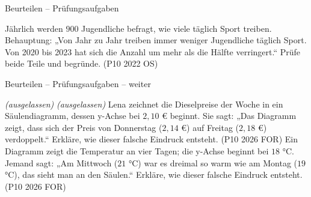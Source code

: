 \begin{aufgabe}{Beurteilen – Prüfungsaufgaben}
\begin{teile}
\teil Jährlich werden $900$ Jugendliche befragt, wie viele täglich Sport treiben. Behauptung: „Von Jahr zu Jahr treiben immer weniger Jugendliche täglich Sport. Von 2020 bis 2023 hat sich die Anzahl um mehr als die Hälfte verringert.“ Prüfe beide Teile und begründe. \hfill (P10 2022 OS)

\end{teile}
\end{aufgabe}

\begin{aufgabe}{Beurteilen – Prüfungsaufgaben – weiter}
\begin{teile}
% 
\steil \textit{(ausgelassen)}
% 
\steil \textit{(ausgelassen)}
\teil Lena zeichnet die Dieselpreise der Woche in ein Säulendiagramm, dessen y-Achse bei $2{,}10$ € beginnt. Sie sagt: „Das Diagramm zeigt, dass sich der Preis von Donnerstag ($2{,}14$ €) auf Freitag ($2{,}18$ €) verdoppelt.“ Erkläre, wie dieser falsche Eindruck entsteht. \hfill (P10 2026 FOR)
\teil Ein Diagramm zeigt die Temperatur an vier Tagen; die y-Achse beginnt bei $18$ °C. Jemand sagt: „Am Mittwoch ($21$ °C) war es dreimal so warm wie am Montag ($19$ °C), das sieht man an den Säulen.“ Erkläre, wie dieser falsche Eindruck entsteht. \hfill (P10 2026 FOR)

\end{teile}
\end{aufgabe}
